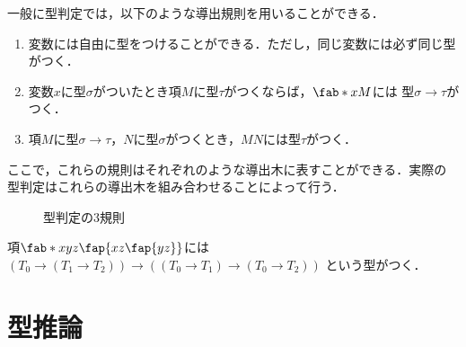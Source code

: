\documentclass[uplatex,dvipdfmx,report,fleqn]{jsbook}
\begin{document}
一般に型判定では，以下のような導出規則を用いることができる．
%
\begin{enumerate}
\item 変数には自由に型をつけることができる．ただし，同じ変数には必ず同じ型がつく．
\item 変数$x$に型$\sigma$がついたとき項$M$に型$\tau$がつくならば，$\fab*{x}{M}$には
型$\sigma\to\tau$がつく．
\item 項$M$に型$\sigma\to\tau$，$N$に型$\sigma$がつくとき，$MN$には型$\tau$がつく．
\end{enumerate}
%
ここで，これらの規則はそれぞれのような導出木に表すことができる．実際の
型判定はこれらの導出木を組み合わせることによって行う．
%
\begin{figure}
\centering
{}
\begin{minipage}{.4\textwidth}
\centering
{}
\end{minipage}
\begin{minipage}{.45\textwidth}
\centering
{}
\end{minipage}
\caption{型判定の3規則}
\end{figure}
%
\begin{example}
項$\fab*{xyz}{\fap{xz\fap{yz}}}$には$(T_0\to(T_1\to T_2))\to((T_0\to T_1)\to(T_0\to T_2))$
という型がつく．
%
\begin{prooftree}
\end{prooftree}
\end{example}

\NeedsRevision

\section{型推論}

\NeedsRevision
\end{document}
